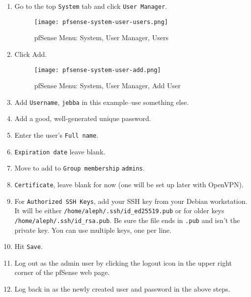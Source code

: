 \begin{enumerate}
 \item Go to the top \texttt{System} tab and click \texttt{User Manager}.
\begin{figure}[h!]
\begin{center}
\texttt{[image: pfsense-system-user-users.png]}
 \caption{pfSense Menu: System, User Manager, Users}
 \label{fig:pfsense-system-user-users}
\end{center}
\end{figure}

 \item Click Add.

\begin{figure}[h!]
\begin{center}
\texttt{[image: pfsense-system-user-add.png]}
 \caption{pfSense Menu: System, User Manager, Add User}
 \label{fig:pfsense-system-user-add}
\end{center}
\end{figure}

 \item Add \texttt{Username}, \texttt{jebba} in this example--use something else.
 \item Add a good, well-generated unique password.
 \item Enter the user's \texttt{Full name}.
 \item \texttt{Expiration date} leave blank.
 \item Move to add to \texttt{Group membership} \texttt{admins}.
 \item \texttt{Certificate}, leave blank for now (one will be set up later with OpenVPN).
 \item For \texttt{Authorized SSH Keys}, add your SSH key from your Debian workstation. It will be either \texttt{/home/aleph/.ssh/id\_ed25519.pub} or for older keys \texttt{/home/aleph/.ssh/id\_rsa.pub}. Be sure the file ends in \texttt{.pub} and isn't the private key. You can use multiple keys, one per line.
 \item Hit \texttt{Save}.
 \item Log out as the admin user by clicking the logout icon in the upper right corner of the pfSense web page.
 \item Log back in as the newly created user and password in the above steps.
\end{enumerate}

